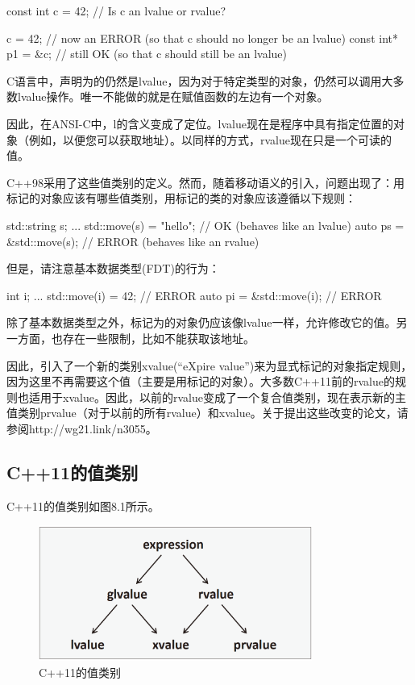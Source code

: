 \begin{cppcode}
const int c = 42; // Is c an lvalue or rvalue?

c = 42; // now an ERROR (so that c should no longer be an lvalue)
const int* p1 = &c; // still OK (so that c should still be an lvalue)
\end{cppcode}

C语言中，声明为的仍然是lvalue，因为对于特定类型的对象，仍然可以调用大多数lvalue操作。唯一不能做的就是在赋值函数的左边有一个对象。

因此，在ANSI-C中，l的含义变成了定位。lvalue现在是程序中具有指定位置的对象（例如，以便您可以获取地址）。以同样的方式，rvalue现在只是一个可读的值。

C++98采用了这些值类别的定义。然而，随着移动语义的引入，问题出现了：用标记的对象应该有哪些值类别，用标记的类的对象应该遵循以下规则：

\begin{cppcode}
std::string s;
...
std::move(s) = "hello"; // OK (behaves like an lvalue)
auto ps = &std::move(s); // ERROR (behaves like an rvalue)
\end{cppcode}

但是，请注意基本数据类型(FDT)的行为：

\begin{cppcode}
int i;
...
std::move(i) = 42; // ERROR
auto pi = &std::move(i); // ERROR
\end{cppcode}

除了基本数据类型之外，标记为的对象仍应该像lvalue一样，允许修改它的值。另一方面，也存在一些限制，比如不能获取该地址。

因此，引入了一个新的类别xvalue(“eXpire value”)来为显式标记的对象指定规则，因为这里不再需要这个值（主要是用标记的对象）。大多数C++11前的rvalue的规则也适用于xvalue。因此，以前的rvalue变成了一个复合值类别，现在表示新的主值类别prvalue（对于以前的所有rvalue）和xvalue。关于提出这些改变的论文，请参阅http://wg21.link/n3055。

\subsection{C++11的值类别}

C++11的值类别如图8.1所示。

\begin{figure}
	\includegraphics[width=0.8\textwidth]{part1/ch8/images/1}
	\caption{C++11的值类别}
\end{figure}

